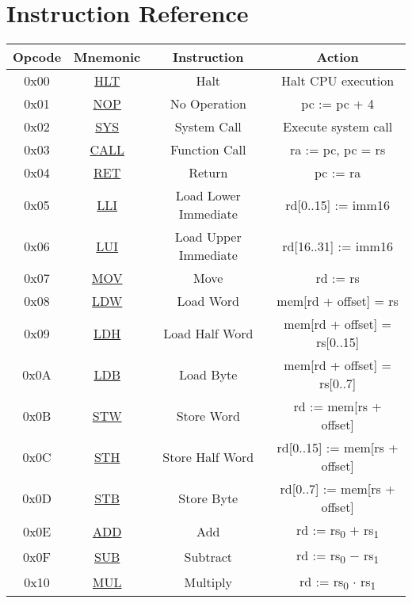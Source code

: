 \section{Instruction Reference}

\begin{center}
	\begin{tabular}{|c|c|c|c|}
		\hline
		\textbf{Opcode} & \textbf{Mnemonic} & \textbf{Instruction} & \textbf{Action}\\
		\hline
		0x00 & \hyperref[sec:HLT]{HLT} & Halt & Halt CPU execution\\
		\hline
		0x01 & \hyperref[sec:NOP]{NOP} & No Operation & pc := pc + 4\\
		\hline
		0x02 & \hyperref[sec:SYS]{SYS} & System Call & Execute system call\\
		\hline
		0x03 & \hyperref[sec:CALL]{CALL} & Function Call & ra := pc, pc = rs\\
		\hline
		0x04 & \hyperref[sec:RET]{RET} & Return & pc := ra\\
		\hline
		\hline
		0x05 & \hyperref[sec:LLI]{LLI} & Load Lower Immediate & rd[0..15] := imm16\\
		\hline
		0x06 & \hyperref[sec:LUI]{LUI} & Load Upper Immediate & rd[16..31] := imm16\\
		\hline
		0x07 & \hyperref[sec:MOV]{MOV} & Move & rd := rs\\
		\hline
		\hline
		0x08 & \hyperref[sec:LDW]{LDW} & Load Word & mem[rd + offset] = rs\\
		\hline
		0x09 & \hyperref[sec:LDH]{LDH} & Load Half Word & mem[rd + offset] = rs[0..15]\\
		\hline
		0x0A & \hyperref[sec:LDB]{LDB} & Load Byte & mem[rd + offset] = rs[0..7]\\
		\hline
		0x0B & \hyperref[sec:STW]{STW} & Store Word & rd := mem[rs + offset]\\
		\hline
		0x0C & \hyperref[sec:STH]{STH} & Store Half Word & rd[0..15] := mem[rs + offset]\\
		\hline
		0x0D & \hyperref[sec:STB]{STB} & Store Byte & rd[0..7] := mem[rs + offset]\\
		\hline
		\hline
		0x0E & \hyperref[sec:ADD]{ADD} & Add & rd := rs\textsubscript{0} $+$ rs\textsubscript{1}\\
		\hline
		0x0F & \hyperref[sec:SUB]{SUB} & Subtract & rd := rs\textsubscript{0} $-$ rs\textsubscript{1}\\
		\hline
		0x10 & \hyperref[sec:MUL]{MUL} & Multiply & rd := rs\textsubscript{0} $\cdot$ rs\textsubscript{1}\\

\end{tabular}
\end{center}

